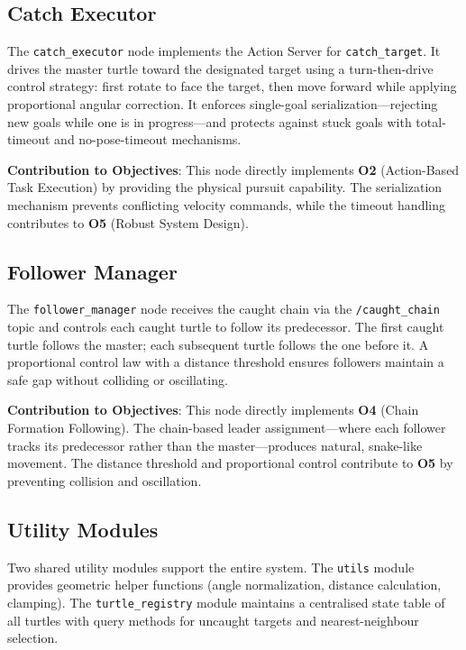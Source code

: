 \subsection{Catch Executor}

The \texttt{catch\_executor} node implements the Action Server for \texttt{catch\_target}. It drives the master turtle toward the designated target using a turn-then-drive control strategy: first rotate to face the target, then move forward while applying proportional angular correction. It enforces single-goal serialization---rejecting new goals while one is in progress---and protects against stuck goals with total-timeout and no-pose-timeout mechanisms.

\textbf{Contribution to Objectives}: This node directly implements \textbf{O2} (Action-Based Task Execution) by providing the physical pursuit capability. The serialization mechanism prevents conflicting velocity commands, while the timeout handling contributes to \textbf{O5} (Robust System Design).

\subsection{Follower Manager}

The \texttt{follower\_manager} node receives the caught chain via the \texttt{/caught\_chain} topic and controls each caught turtle to follow its predecessor. The first caught turtle follows the master; each subsequent turtle follows the one before it. A proportional control law with a distance threshold ensures followers maintain a safe gap without colliding or oscillating.

\textbf{Contribution to Objectives}: This node directly implements \textbf{O4} (Chain Formation Following). The chain-based leader assignment---where each follower tracks its predecessor rather than the master---produces natural, snake-like movement. The distance threshold and proportional control contribute to \textbf{O5} by preventing collision and oscillation.

\subsection{Utility Modules}

Two shared utility modules support the entire system. The \texttt{utils} module provides geometric helper functions (angle normalization, distance calculation, clamping). The \texttt{turtle\_registry} module maintains a centralised state table of all turtles with query methods for uncaught targets and nearest-neighbour selection.

